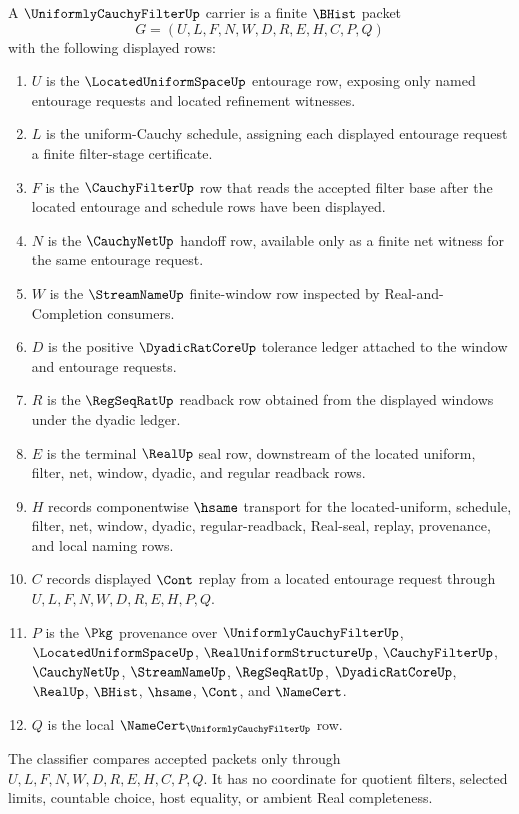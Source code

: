 \begin{definition}
\label{def:uniformly-cauchy-filter-carrier}
A $\UniformlyCauchyFilterUp$ carrier is a finite $\BHist$ packet
$$
G=(U,L,F,N,W,D,R,E,H,C,P,Q)
$$
with the following displayed rows:
\begin{enumerate}
\item $U$ is the $\LocatedUniformSpaceUp$ entourage row, exposing only named entourage requests and located refinement witnesses.
\item $L$ is the uniform-Cauchy schedule, assigning each displayed entourage request a finite filter-stage certificate.
\item $F$ is the $\CauchyFilterUp$ row that reads the accepted filter base after the located entourage and schedule rows have been displayed.
\item $N$ is the $\CauchyNetUp$ handoff row, available only as a finite net witness for the same entourage request.
\item $W$ is the $\StreamNameUp$ finite-window row inspected by Real-and-Completion consumers.
\item $D$ is the positive $\DyadicRatCoreUp$ tolerance ledger attached to the window and entourage requests.
\item $R$ is the $\RegSeqRatUp$ readback row obtained from the displayed windows under the dyadic ledger.
\item $E$ is the terminal $\RealUp$ seal row, downstream of the located uniform, filter, net, window, dyadic, and regular readback rows.
\item $H$ records componentwise $\hsame$ transport for the located-uniform, schedule, filter, net, window, dyadic, regular-readback, Real-seal, replay, provenance, and local naming rows.
\item $C$ records displayed $\Cont$ replay from a located entourage request through $U,L,F,N,W,D,R,E,H,P,Q$.
\item $P$ is the $\Pkg$ provenance over $\UniformlyCauchyFilterUp$, $\LocatedUniformSpaceUp$, $\RealUniformStructureUp$, $\CauchyFilterUp$, $\CauchyNetUp$, $\StreamNameUp$, $\RegSeqRatUp$, $\DyadicRatCoreUp$, $\RealUp$, $\BHist$, $\hsame$, $\Cont$, and $\NameCert$.
\item $Q$ is the local $\NameCert_{\UniformlyCauchyFilterUp}$ row.
\end{enumerate}
The classifier compares accepted packets only through $U,L,F,N,W,D,R,E,H,C,P,Q$. It has no coordinate for quotient filters, selected limits, countable choice, host equality, or ambient Real completeness.
\end{definition}


